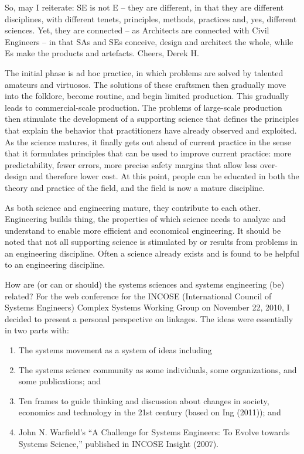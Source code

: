So, may I reiterate: SE is not E – they are different, in that they are different disciplines, with different tenets, principles, methods, practices and, yes, different sciences. Yet, they are connected – as Architects are connected with Civil Engineers – in that SAs and SEs conceive, design and architect the whole, while Es make the products and artefacts. Cheers, Derek H.

The initial phase is ad hoc practice, in which problems are solved by talented amateurs and virtuosos. The solutions of these craftsmen then gradually move into the folklore, become routine, and begin limited production. This gradually leads to commercial-scale production. The problems of large-scale production then stimulate the development of a supporting science that defines the principles that explain the behavior that practitioners have already observed and exploited. As the science matures, it finally gets out ahead of current practice in the sense that it formulates principles that can be used to improve current practice: more predictability, fewer errors, more precise safety margins that allow less over-design and therefore lower cost. At this point, people can be educated in both the theory and practice of the field, and the field is now a mature discipline.

As both science and engineering mature, they contribute to each other. Engineering builds thing, the properties of which science needs to analyze and understand to enable more efficient and economical engineering. It should be noted that not all supporting science is stimulated by or results from problems in an engineering discipline. Often a science already exists and is found to be helpful to an engineering discipline.

How are (or can or should) the systems sciences and systems engineering (be) related?  For the web conference for the INCOSE (International Council of Systems Engineers) Complex Systems Working Group on November 22, 2010, I decided to present a personal perspective on linkages. The ideas were essentially in two parts with:

\begin{enumerate}
\item The systems movement as a system of ideas including
\item The systems science community as some individuals, some organizations, and some publications; and
\item Ten frames to guide thinking and discussion about changes in society, economics and technology in the 21st century (based on Ing (2011)); and
\item John N. Warfield’s ``A Challenge for Systems Engineers: To Evolve towards Systems Science,'' published in INCOSE Insight (2007).
\end{enumerate}

